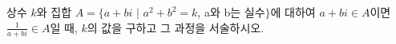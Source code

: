 \documentclass[11pt]{exam}
\begin{document}
\begin{questions}
	
\addpoints
\question[8] 상수 $k$와 집합 $A=\{a+bi$ $\vert$ $a^2+b^2=k$, a와 b는 실수$\}$에  대하여 $a+bi \in A$이면 $\frac{1}{a+bi} \in A$일 때, $k$의 값을 구하고 그 과정을 서술하시오.
\end{questions}
\end{document}
